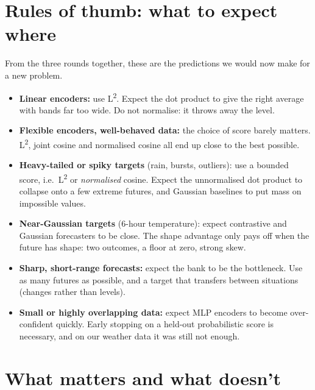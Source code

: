 \documentclass[11pt]{article}
\newcommand{\Ltwo}{L\textsuperscript{2}}
\begin{document}
\section{Rules of thumb: what to expect where}

From the three rounds together, these are the predictions we would now make for a new
problem.
\begin{itemize}
\item \textbf{Linear encoders:} use \Ltwo. Expect the dot product to give the right average
  with bands far too wide. Do not normalise: it throws away the level.
\item \textbf{Flexible encoders, well-behaved data:} the choice of score barely matters.
  \Ltwo, joint cosine and normalised cosine all end up close to the best possible.
\item \textbf{Heavy-tailed or spiky targets} (rain, bursts, outliers): use a bounded score,
  i.e.\ \Ltwo{} or \emph{normalised} cosine. Expect the unnormalised dot product to collapse
  onto a few extreme futures, and Gaussian baselines to put mass on impossible values.
\item \textbf{Near-Gaussian targets} (6-hour temperature): expect contrastive and Gaussian
  forecasters to be close. The shape advantage only pays off when the future has shape:
  two outcomes, a floor at zero, strong skew.
\item \textbf{Sharp, short-range forecasts:} expect the bank to be the bottleneck. Use as
  many futures as possible, and a target that transfers between situations (changes rather
  than levels).
\item \textbf{Small or highly overlapping data:} expect MLP encoders to become over-confident
  quickly. Early stopping on a held-out probabilistic score is necessary, and on our weather
  data it was still not enough.
\end{itemize}

\section{What matters and what doesn't}
\end{document}
